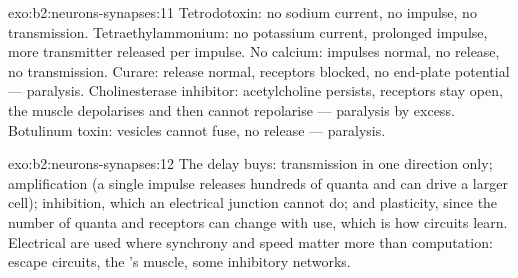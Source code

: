 \begin{solution}{exo:b2:neurons-synapses:11}
Tetrodotoxin: no sodium current, no impulse, no transmission.
Tetraethylammonium: no potassium current, prolonged impulse, more
transmitter released per impulse. No calcium: impulses normal,
no release, no transmission. Curare: release normal, receptors
blocked, no end-plate potential --- paralysis. Cholinesterase
inhibitor: acetylcholine persists, receptors stay open, the muscle
depolarises and then cannot repolarise --- paralysis by excess.
Botulinum toxin: vesicles cannot fuse, no release --- paralysis.
\end{solution}

\begin{solution}{exo:b2:neurons-synapses:12}
The delay buys: transmission in one direction only; amplification
(a single impulse releases hundreds of quanta and can drive a
larger cell); inhibition, which an electrical junction cannot do;
and plasticity, since the number of quanta and receptors can change
with use, which is how circuits learn. Electrical  are used
where synchrony and speed matter more than computation: escape
circuits, the 's muscle, some inhibitory networks.
\end{solution}

